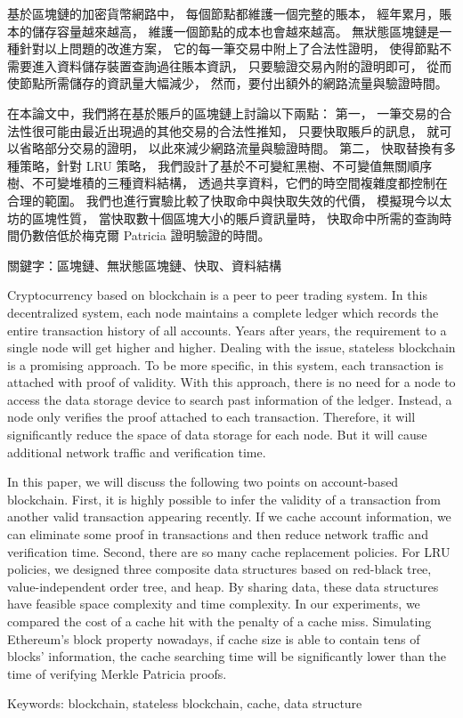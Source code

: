 \begin{abstractzh}
基於區塊鏈的加密貨幣網路中，
每個節點都維護一個完整的賬本，
經年累月，賬本的儲存容量越來越高，
維護一個節點的成本也會越來越高。
無狀態區塊鏈是一種針對以上問題的改進方案，
它的每一筆交易中附上了合法性證明，
使得節點不需要進入資料儲存裝置查詢過往賬本資訊，
只要驗證交易內附的證明即可，
從而使節點所需儲存的資訊量大幅減少，
然而，要付出額外的網路流量與驗證時間。

在本論文中，我們將在基於賬戶的區塊鏈上討論以下兩點：
第一，
一筆交易的合法性很可能由最近出現過的其他交易的合法性推知，
只要快取賬戶的訊息，
就可以省略部分交易的證明，
以此來減少網路流量與驗證時間。
第二，
快取替換有多種策略，針對 LRU 策略，
我們設計了基於不可變紅黑樹、不可變值無關順序樹、不可變堆積的三種資料結構，
透過共享資料，它們的時空間複雜度都控制在合理的範圍。
我們也進行實驗比較了快取命中與快取失效的代價，
模擬現今以太坊的區塊性質，
當快取數十個區塊大小的賬戶資訊量時，
快取命中所需的查詢時間仍數倍低於梅克爾 Patricia 證明驗證的時間。


\bigbreak
\noindent
關鍵字：區塊鏈、無狀態區塊鏈、快取、資料結構
\end{abstractzh}

\begin{abstracten}

Cryptocurrency based on blockchain is a peer to peer trading
system. In this decentralized system,
each node maintains a complete ledger which
records the entire transaction history of all accounts.
Years after years, the requirement to a single node will
get higher and higher. Dealing with the issue, stateless
blockchain is a promising approach. To be more specific,
in this system, each transaction is attached with proof
of validity. With this approach, there is no need for a node
to access the data storage device to search past information
of the ledger. Instead, a node only verifies the proof attached
to each transaction. Therefore, it will significantly
reduce the space of data storage for each node.
But it will cause additional network traffic and
verification time.

In this paper, we will discuss the following two points
on account-based blockchain.
First,
it is highly possible to infer the validity of
a transaction from another valid transaction appearing recently.
If we cache account information, we can eliminate some
proof in transactions and then reduce network traffic
and verification time.
Second,
there are so many cache replacement policies.
For LRU policies, we designed three composite data
structures based on red-black tree, value-independent order tree, and heap.
By sharing data, these data structures have feasible space complexity and time complexity.
In our experiments, we compared the cost of a
cache hit with the penalty of a cache miss.
Simulating Ethereum's block property nowadays,
if cache size is able to contain tens of blocks' information,
the cache searching time will be significantly lower than
the time of verifying Merkle Patricia proofs.

\bigbreak
\noindent
Keywords: blockchain, stateless blockchain, cache, data structure
\end{abstracten}

